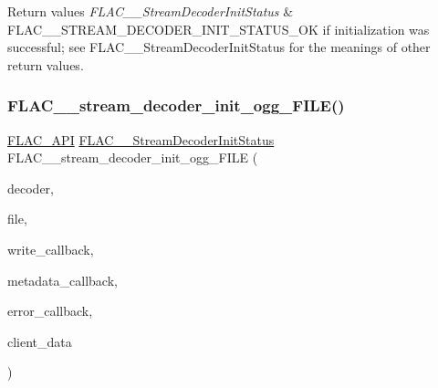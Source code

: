 \begin{DoxyRetVals}{Return values}
{\em F\+L\+A\+C\+\_\+\+\_\+\+Stream\+Decoder\+Init\+Status} & {\ttfamily F\+L\+A\+C\+\_\+\+\_\+\+S\+T\+R\+E\+A\+M\+\_\+\+D\+E\+C\+O\+D\+E\+R\+\_\+\+I\+N\+I\+T\+\_\+\+S\+T\+A\+T\+U\+S\+\_\+\+OK} if initialization was successful; see F\+L\+A\+C\+\_\+\+\_\+\+Stream\+Decoder\+Init\+Status for the meanings of other return values. \\
\hline
\end{DoxyRetVals}
\mbox{\label{group__flac__stream__decoder_gac6a35b1db07e057ec9912f637b37dd74}} 
\subsubsection{\texorpdfstring{FLAC\_\_stream\_decoder\_init\_ogg\_FILE()}{FLAC\_\_stream\_decoder\_init\_ogg\_FILE()}}
{\footnotesize\ttfamily \mbox{\hyperlink{group__flac__export_ga56ca07df8a23310707732b1c0007d6f5}{F\+L\+A\+C\+\_\+\+A\+PI}} \mbox{\hyperlink{group__flac__stream__decoder_gaaed54a24ac6310d29c5cafba79759c44}{F\+L\+A\+C\+\_\+\+\_\+\+Stream\+Decoder\+Init\+Status}} F\+L\+A\+C\+\_\+\+\_\+stream\+\_\+decoder\+\_\+init\+\_\+ogg\+\_\+\+F\+I\+LE (\begin{DoxyParamCaption}\item[{\mbox{\hyperlink{struct_f_l_a_c_____stream_decoder}{F\+L\+A\+C\+\_\+\+\_\+\+Stream\+Decoder}} $\ast$}]{decoder,  }\item[{F\+I\+LE $\ast$}]{file,  }\item[{\mbox{\hyperlink{group__flac__stream__decoder_ga61e48dc2c0d2f6c5519290ff046874a4}{F\+L\+A\+C\+\_\+\+\_\+\+Stream\+Decoder\+Write\+Callback}}}]{write\+\_\+callback,  }\item[{\mbox{\hyperlink{group__flac__stream__decoder_ga6aa87c01744c1c601b7f371f627b6e14}{F\+L\+A\+C\+\_\+\+\_\+\+Stream\+Decoder\+Metadata\+Callback}}}]{metadata\+\_\+callback,  }\item[{\mbox{\hyperlink{group__flac__stream__decoder_gac896ee6a12668e9015fab4fbc6aae996}{F\+L\+A\+C\+\_\+\+\_\+\+Stream\+Decoder\+Error\+Callback}}}]{error\+\_\+callback,  }\item[{\mbox{\hyperlink{_s_d_l__opengles2__gl2ext_8h_ae5d8fa23ad07c48bb609509eae494c95}{void}} $\ast$}]{client\+\_\+data }\end{DoxyParamCaption})}

